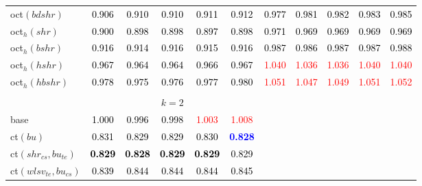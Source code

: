 \begin{tabular}[t]{l|>{}cccc>{}c|ccccc}
oct$(bdshr)$ & \textcolor{black}{0.906} & \textcolor{black}{0.910} & \textcolor{black}{0.910} & \textcolor{black}{0.911} & \textcolor{black}{0.912} & \textcolor{black}{0.977} & \textcolor{black}{0.981} & \textcolor{black}{0.982} & \textcolor{black}{0.983} & \textcolor{black}{0.985}\\
oct$_h(shr)$ & \textcolor{black}{0.900} & \textcolor{black}{0.898} & \textcolor{black}{0.898} & \textcolor{black}{0.897} & \textcolor{black}{0.898} & \textcolor{black}{0.971} & \textcolor{black}{0.969} & \textcolor{black}{0.969} & \textcolor{black}{0.969} & \textcolor{black}{0.969}\\
oct$_h(bshr)$ & \textcolor{black}{0.916} & \textcolor{black}{0.914} & \textcolor{black}{0.916} & \textcolor{black}{0.915} & \textcolor{black}{0.916} & \textcolor{black}{0.987} & \textcolor{black}{0.986} & \textcolor{black}{0.987} & \textcolor{black}{0.987} & \textcolor{black}{0.988}\\
oct$_h(hshr)$ & \textcolor{black}{0.967} & \textcolor{black}{0.964} & \textcolor{black}{0.964} & \textcolor{black}{0.966} & \textcolor{black}{0.967} & \textcolor{red}{1.040} & \textcolor{red}{1.036} & \textcolor{red}{1.036} & \textcolor{red}{1.040} & \textcolor{red}{1.040}\\
oct$_h(hbshr)$ & \textcolor{black}{0.978} & \textcolor{black}{0.975} & \textcolor{black}{0.976} & \textcolor{black}{0.977} & \textcolor{black}{0.980} & \textcolor{red}{1.051} & \textcolor{red}{1.047} & \textcolor{red}{1.049} & \textcolor{red}{1.051} & \textcolor{red}{1.052}\\[-1.5ex]
\hline\\[-1.5ex]
\addlinespace[0.3em]
\multicolumn{1}{c}{} & \multicolumn{5}{c}{\textbf{$k = 2$}} & \multicolumn{5}{c}{}\\
base & \textcolor{black}{1.000} & \textcolor{black}{0.996} & \textcolor{black}{0.998} & \textcolor{red}{1.003} & \textcolor{red}{1.008} &  &  &  &  & \\
ct$(bu)$ & \textcolor{black}{0.831} & \textcolor{black}{0.829} & \textcolor{black}{0.829} & \textcolor{black}{0.830} & \textcolor{blue}{\textbf{0.828}} &  &  &  &  & \\
ct$(shr_{cs}, bu_{te})$ & \textcolor{black}{\textbf{0.829}} & \textcolor{black}{\textbf{0.828}} & \textcolor{black}{\textbf{0.829}} & \textcolor{black}{\textbf{0.829}} & \textcolor{black}{0.829} &  &  &  &  & \\
ct$(wlsv_{te}, bu_{cs})$ & \textcolor{black}{0.839} & \textcolor{black}{0.844} & \textcolor{black}{0.844} & \textcolor{black}{0.844} & \textcolor{black}{0.845} &  &  &  &  & \\

\end{tabular}
